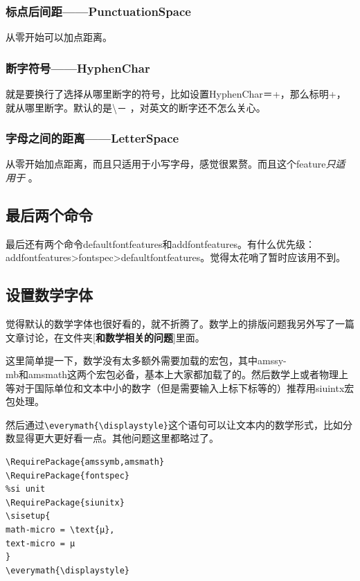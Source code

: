 \documentclass[12pt,oneside]{book}
\begin{document}
\begin{common-format}
\subsubsection{标点后间距——PunctuationSpace}
从零开始可以加点距离。

\subsubsection{断字符号——HyphenChar}
就是要换行了选择从哪里断字的符号，比如设置HyphenChar＝{+}，那么标明+，就从哪里断字。默认的是\textbackslash － ，对英文的断字还不怎么关心。

\subsubsection{字母之间的距离——LetterSpace}
从零开始加点距离，而且只适用于小写字母，感觉很累赘。而且这个feature\emph{只适用于\XeTeX} 。


\subsection{最后两个命令}
最后还有两个命令defaultfontfeatures和addfontfeatures。有什么优先级：\\ addfontfeatures>fontspec>defaultfontfeatures。觉得太花哨了暂时应该用不到。




\subsection{设置数学字体}
觉得默认的数学字体也很好看的，就不折腾了。数学上的排版问题我另外写了一篇文章讨论，在文件夹[\textbf{和数学相关的问题}]里面。

这里简单提一下，数学没有太多额外需要加载的宏包，其中amssy-\\mb和amsmath这两个宏包必备，基本上大家都加载了的。然后数学上或者物理上等对于国际单位和文本中小的数字（但是需要输入上标下标等的）推荐用siuintx宏包处理。

然后通过\verb+\everymath{\displaystyle}+这个语句可以让文本内的数学形式，比如分数显得更大更好看一点。其他问题这里都略过了。

\begin{Verbatim}
\RequirePackage{amssymb,amsmath}
\RequirePackage{fontspec}
%si unit
\RequirePackage{siunitx}
\sisetup{
math-micro = \text{μ},
text-micro = μ
}
\everymath{\displaystyle}
\end{Verbatim}




\end{common-format}
\end{document}
